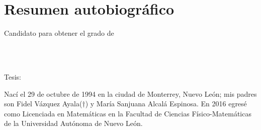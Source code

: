 
\chapter*{Resumen autobiográfico}
\thispagestyle{empty}

\begin{center}
\autor

Candidato para obtener el grado de\\
\grado\\
\orientacion\bigskip

\uanl\\
\fime\bigskip

Tesis:\\
\textsc{\large\titulo}
\end{center}\bigskip

Nací el 29 de octubre de 1994 en la ciudad de Monterrey, Nuevo León; mis padres son Fidel Vázquez Ayala($\dagger$) y María Sanjuana Alcalá Espinosa. En 2016 egresé como Licenciada en Matemáticas en la Facultad de Ciencias Físico-Matemáticas de la Universidad Autónoma de Nuevo León.

